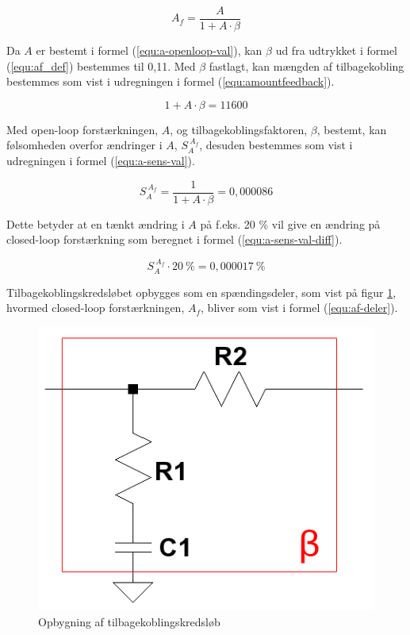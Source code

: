 \begin{equation}
\label{equ:af_def}
A_f = \frac{A}{1 + A \cdot \beta}
\end{equation}

Da $A$ er bestemt i formel (\ref{equ:a-openloop-val}), kan $\beta$ ud fra udtrykket i formel (\ref{equ:af_def}) bestemmes til 0,11. Med $\beta$ fastlagt, kan mængden af tilbagekobling bestemmes som vist i udregningen i formel (\ref{equ:amountfeedback}).

\begin{equation}
\label{equ:amountfeedback}
1 + A \cdot \beta = 11600
\end{equation}

Med open-loop forstærkningen, $A$, og tilbagekoblingsfaktoren, $\beta$, bestemt, kan følsomheden overfor ændringer i $A$, $S_A^{~A_f}$, desuden bestemmes som vist i udregningen i formel (\ref{equ:a-sens-val}).

\begin{equation}
\label{equ:a-sens-val}
S_A^{~A_f} = \frac{1}{1 + A \cdot \beta} = 0,000086
\end{equation}

Dette betyder at en tænkt ændring i $A$ på f.eks. 20 \% vil give en ændring på closed-loop forstærkning som beregnet i formel (\ref{equ:a-sens-val-diff}).

\begin{equation}
\label{equ:a-sens-val-diff}
S_A^{~A_f} \cdot 20~\% = 0,000017~\%
\end{equation}

Tilbagekoblingskredsløbet opbygges som en spændingsdeler, som vist på figur \ref{fig:beta-clean}, hvormed closed-loop forstærkningen, $A_f$, bliver som vist i formel (\ref{equ:af-deler}).

\begin{figure}[h]
\centering
\includegraphics[scale=0.3]{teknisk/effektforstaerker/beta-clean.png}
\caption{Opbygning af tilbagekoblingskredsløb}
\label{fig:beta-clean}
\end{figure} 

